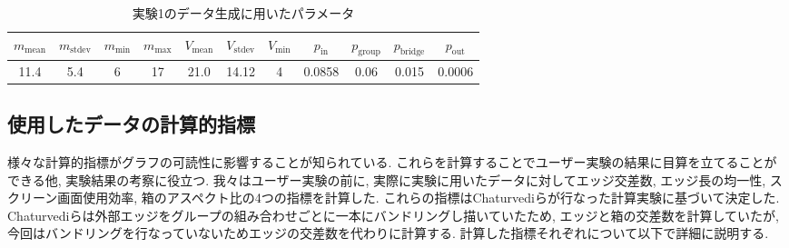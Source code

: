 \documentclass{kuee}
\begin{document}
\begin{table}[b]
  \begin{center}
  \caption{実験1のデータ生成に用いたパラメータ\label{tab:parameters}}
  \begin{tabular}{|c|c|c|c|c|c|c|c|c|c|c|} \hline
  $m_{\text{mean}}$ & $m_{\text{stdev}}$ & $m_{\text{min}}$ & $m_{\text{max} }$ & $V_{\text{mean}}$ & $V_{\text{stdev}}$ & $V_{\text{min}}$ & $p_{\text{in}}$ & $p_{\text{group}}$ & $p_{\text{bridge}}$ & $p_{\text{out}}$ \\ \hline
  11.4 & 5.4 & 6 & 17 & 21.0 & 14.12 & 4 & 0.0858 & 0.06 & 0.015 & 0.0006\\ \hline
  \end{tabular}
  \end{center}
\end{table}

\subsection{使用したデータの計算的指標}
\label{subsec:metric_of_data}

様々な計算的指標がグラフの可読性に影響することが知られている.
これらを計算することでユーザー実験の結果に目算を立てることができる他, 実験結果の考察に役立つ.
我々はユーザー実験の前に, 実際に実験に用いたデータに対してエッジ交差数, エッジ長の均一性, スクリーン画面使用効率, 箱のアスペクト比の4つの指標を計算した.
これらの指標はChaturvediらが行なった計算実験\cite{chaturvedi2014group}に基づいて決定した.
Chaturvediらは外部エッジをグループの組み合わせごとに一本にバンドリングし描いていたため, エッジと箱の交差数を計算していたが, 今回はバンドリングを行なっていないためエッジの交差数を代わりに計算する.
計算した指標それぞれについて以下で詳細に説明する.
\end{document}
